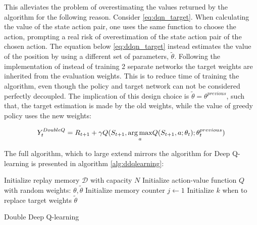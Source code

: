 This alleviates the problem of overestimating the values returned by the algorithm for the following reason. Consider \eqref{eq:dqn_target}. When calculating the value of the state action pair, one uses the same function to choose the action, prompting  a real risk of overestimation of the state action pair of the chosen action. The equation below \eqref{eq:ddqn_target} instead estimates the value of the position by using a different set of parameters, $\tilde{\theta}$. Following the implementation of \textcite{van_hasselt_deep_2015} instead of training 2 separate networks the target weights are inherited from the evaluation weights. This is to reduce time of training the algorithm, even though the policy and target network can not be considered perfectly decoupled. The implication of this design choice is $\tilde{\theta} = \theta^{previous}$, such that, the target estimation is made by the old weights, while the value of greedy policy uses the new weights:

\begin{equation}\label{eq:ddqn_target_final}
    Y_t^{DoubleQ} = R_{t+1} + \gamma Q(S_{t+1}, \underset{a}{\operatorname*{arg\,max}}Q(S_{t+1}, a; \theta_t); \theta_t^{previous}) 
\end{equation}

The full algorithm, which to large extend mirrors the algorithm for Deep Q-learning is presented in algorithm \ref{alg:ddqlearning}:

\begin{algorithm}[H]
\SetAlgoLined
 Initialize replay memory $\mathcal{D}$ with capacity $N$\;
 Initialize action-value function $Q$ with random weights: $\theta, \tilde{\theta}$\;
 Initialize memory counter $j \leftarrow 1$\;
 Initialize $k$ when to replace target weights $\tilde{\theta}$\;
\caption{Double Deep Q-learning}
\label{alg:ddqlearning}
\end{algorithm}

